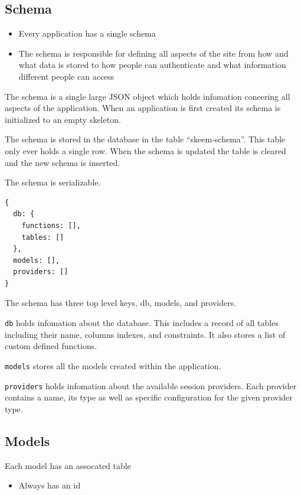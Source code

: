 \documentclass[
  12pt,
]{article}
\newcommand{\passthrough}[1]{#1}
\providecommand{\tightlist}{%
  \setlength{\itemsep}{0pt}\setlength{\parskip}{0pt}}
\begin{document}
\hypertarget{schema}{%
\subsection{Schema}\label{schema}}

\begin{itemize}
\tightlist
\item
  Every application has a single schema
\item
  The schema is responsible for defining all aspects of the site from
  how and what data is stored to how people can authenticate and what
  information different people can access
\end{itemize}

The schema is a single large JSON object which holds infomation
concering all aspects of the application. When an application is first
created its schema is initialized to an empty skeleton.

The schema is stored in the database in the table ``skeem-schema''. This
table only ever holds a single row. When the schema is updated the table
is cleared and the new schema is inserted.

The schema is serializable.

\begin{lstlisting}[caption={The empty schema}]
 {
  db: {
    functions: [],
    tables: []
  },
  models: [],
  providers: []
}
\end{lstlisting}

The schema has three top level keys, db, models, and providers.

\passthrough{\lstinline!db!} holds infomation about the database. This
includes a record of all tables including their name, columns indexes,
and constraints. It also stores a list of custom defined functions.

\passthrough{\lstinline!models!} stores all the models created within
the application.

\passthrough{\lstinline!providers!} holds infomation about the available
session providers. Each provider contains a name, its type as well as
specific configuration for the given provider type.

\hypertarget{models-1}{%
\subsection{Models}\label{models-1}}

Each model has an assocated table

\begin{itemize}
\tightlist
\item
  Always has an id
\end{itemize}
\end{document}
